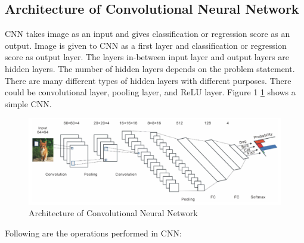\subsection{Architecture of Convolutional Neural Network}
CNN takes image as an input and gives classification or regression score as an output. Image is given to CNN as a first layer and classification or regression score as output layer. The layers in-between input layer and output layers are hidden layers. The number of hidden layers depends on the problem statement. There are many different types of hidden layers with different purposes. There could be convolutional layer, pooling layer, and ReLU layer. Figure 1 \ref{cnn} shows a simple CNN.
\begin{figure}[H]
  \centering
  \includegraphics[scale=0.35]{images/Chapter2/cnn.png}
  \caption{Architecture of Convolutional Neural Network \cite{cnn_arch_image}}
  \label{cnn}
\end{figure}

Following are the operations performed in CNN:

